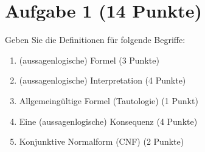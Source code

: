 
\section*{Aufgabe 1 (14 Punkte)}
Geben Sie die Definitionen für folgende Begriffe:
\begin{enumerate}
	\item (aussagenlogische) Formel (3 Punkte)
	\item (aussagenlogische) Interpretation (4 Punkte)
	\item Allgemeingültige Formel (Tautologie) (1 Punkt)
	\item Eine (aussagenlogische) Konsequenz (4 Punkte)
	\item Konjunktive Normalform (CNF) (2 Punkte)
\end{enumerate}

